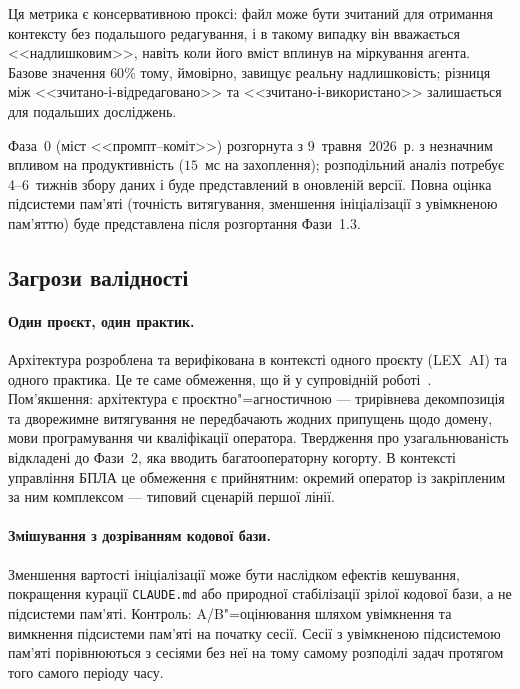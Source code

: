 Ця метрика є консервативною проксі: файл може бути зчитаний для отримання контексту без подальшого редагування, і в такому випадку він вважається <<надлишковим>>, навіть коли його вміст вплинув на міркування агента.
Базове значення $60\%$ тому, ймовірно, завищує реальну надлишковість; різниця між <<зчитано-і-відредаговано>> та <<зчитано-і-використано>> залишається для подальших досліджень.

Фаза~0 (міст <<промпт--коміт>>) розгорнута з 9~травня~2026~р. з незначним впливом на продуктивність ($15$~мс на захоплення); розподільний аналіз потребує 4--6~тижнів збору даних і буде представлений в оновленій версії.
Повна оцінка підсистеми пам'яті (точність витягування, зменшення ініціалізації з увімкненою пам'яттю) буде представлена після розгортання Фази~1.3.


\subsection{Загрози валідності}
\label{sec:threats}

\paragraph{Один проєкт, один практик.}
Архітектура розроблена та верифікована в контексті одного проєкту (LEX~AI) та одного практика.
Це те саме обмеження, що й у супровідній роботі~\citep[\S8]{ovcharov2026edittrace}.
Пом'якшення: архітектура є проєктно"=агностичною --- трирівнева декомпозиція та дворежимне витягування не передбачають жодних припущень щодо домену, мови програмування чи кваліфікації оператора.
Твердження про узагальнюваність відкладені до Фази~2, яка вводить багатооператорну когорту.
В контексті управління БПЛА це обмеження є прийнятним: окремий оператор із закріпленим за ним комплексом --- типовий сценарій першої лінії.

\paragraph{Змішування з дозріванням кодової бази.}
Зменшення вартості ініціалізації може бути наслідком ефектів кешування, покращення курації \texttt{CLAUDE.md} або природної стабілізації зрілої кодової бази, а не підсистеми пам'яті.
Контроль: A/B"=оцінювання шляхом увімкнення та вимкнення підсистеми пам'яті на початку сесії.
Сесії з увімкненою підсистемою пам'яті порівнюються з сесіями без неї на тому самому розподілі задач протягом того самого періоду часу.

